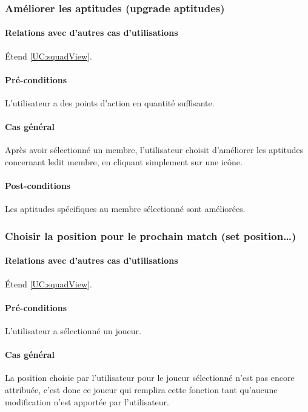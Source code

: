 \subsubsection{Améliorer les aptitudes (upgrade aptitudes)}
\label{UC:seeAptitudes}
\paragraph{Relations avec d'autres cas d'utilisations}
Étend \ref{UC:squadView}.
\paragraph{Pré-conditions}
\begin{list}{}{\leftmargin=1.5em}
\item{L'utilisateur a des points d'action en quantité suffisante.}
\end{list}
\paragraph{Cas général}
Après avoir sélectionné un membre, l'utilisateur choisit d'améliorer les aptitudes concernant ledit membre, en cliquant simplement sur une icône.
\paragraph{Post-conditions}
\begin{list}{}{\leftmargin=1.5em}
\item{Les aptitudes spécifiques au membre sélectionné sont améliorées.}
\end{list} 

\subsubsection{Choisir la position pour le prochain match (set position…)}
\label{UC:choosePosition}
\paragraph{Relations avec d'autres cas d'utilisations}
Étend \ref{UC:squadView}.
\paragraph{Pré-conditions}
L'utilisateur a sélectionné un joueur.
\paragraph{Cas général}
La position choisie par l'utilisateur pour le joueur sélectionné n'est pas encore attribuée, c'est donc ce joueur qui remplira cette fonction tant qu'aucune modification n'est apportée par l'utilisateur.
